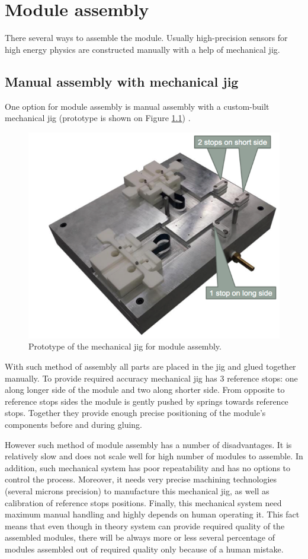 \chapter{Module assembly}

There several ways to assemble the module. Usually high-precision sensors for high energy physics are constructed manually with a help of mechanical jig.

\section{Manual assembly with mechanical jig}

One option for module assembly is manual assembly with a custom-built mechanical jig (prototype is shown on Figure \ref{fig:mechanical_jig}) \cite{Automated_assembly_slides}.

\begin{figure}[ht]\centering
\includegraphics[width=0.7\linewidth]{Data/Module_assembly/Mechanical_jig.png}
\caption{Prototype of the mechanical jig for module assembly.}
\label{fig:mechanical_jig}
\end{figure}

With such method of assembly all parts are placed in the jig and glued together manually. To provide required accuracy mechanical jig has 3 reference stops: one along longer side of the module and two along shorter side. From opposite to reference stops sides the module is gently pushed by springs towards reference stops. Together they provide enough precise positioning of the module's components before and during gluing. 

However such method of module assembly has a number of disadvantages. It is relatively slow and does not scale well for high number of modules to assemble. In addition, such mechanical system has poor repeatability and has no options to control the process. Moreover, it needs very precise machining technologies (several microns precision) to manufacture this mechanical jig, as well as calibration of reference stops positions. Finally, this mechanical system need maximum manual handling and highly depends on human operating it. This fact means that even though in theory system can provide required quality of the assembled modules, there will be always more or less several percentage of modules assembled out of required quality only because of a human mistake.

